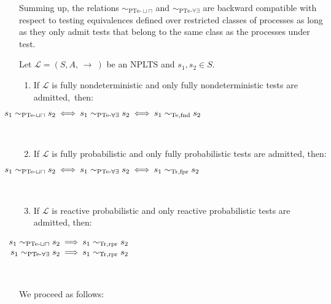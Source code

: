 \documentclass{LMCS}
\newcommand{\cws}[2]
	{\\ \centerline{$#2$} \\[-#1pt]}
\newcommand{\call}
        {\mathcal{L}}
\newcommand{\arrow}[2]
        {\, {\auxarrow\limits^{#1}}_{#2} \,}
\newcommand{\auxarrow}
{\mathop{\longrightarrow}}
\newcommand{\sbis}[1]
	{\sim_{#1}}
\begin{document}
Summing up, the relations $\sbis{\textrm{PTe-}\sqcup\sqcap}$ and $\sbis{\textrm{PTe-}\forall\exists}$ are
backward compatible with respect to testing equivalences defined over restricted classes of processes as
long as they only admit tests that belong to the same class as the processes under test.

	\begin{thm}\label{thm:testing_partial_compat}

Let $\call = (S, A, \! \arrow{}{} \!)$ be an NPLTS and $s_{1}, s_{2} \in S$.

		\begin{enumerate}

\item If $\call$ is fully nondeterministic and only fully nondeterministic tests are admitted,~then:
\cws{10}{\hspace*{-1.2cm} s_{1} \sbis{\textrm{{\rm PTe}-}\sqcup\sqcap} s_{2} \: \Longleftrightarrow \: s_{1}
\sbis{\textrm{{\rm PTe}-}\forall\exists} s_{2} \: \Longleftrightarrow \: s_{1} \sbis{\rm Te,fnd} s_{2}}

\item If $\call$ is fully probabilistic and only fully probabilistic tests are admitted, then:
\cws{10}{\hspace*{-1.2cm} s_{1} \sbis{\textrm{{\rm PTe}-}\sqcup\sqcap} s_{2} \: \Longleftrightarrow \: s_{1}
\sbis{\textrm{{\rm PTe}-}\forall\exists} s_{2} \: \Longleftrightarrow \: s_{1} \sbis{\rm Tr,fpr} s_{2}}

\item If $\call$ is reactive probabilistic and only reactive probabilistic tests are admitted, then:
\cws{10}{\hspace*{-1.2cm}\begin{array}{rcl}
s_{1} \sbis{\textrm{{\rm PTe}-}\sqcup\sqcap} s_{2} & \!\!\! \Longrightarrow \!\!\! & s_{1} \sbis{\rm Tr,rpr}
s_{2} \\
s_{1} \sbis{\textrm{{\rm PTe}-}\forall\exists} s_{2} & \!\!\! \Longrightarrow \!\!\! & s_{1} \sbis{\rm
Tr,rpr} s_{2} \\
\end{array}}

		\end{enumerate}

\proof
We proceed as follows:

		\begin{enumerate}


\end{enumerate}
\end{thm}
\end{document}
